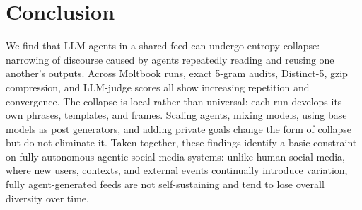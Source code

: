 \documentclass[11pt]{article}
\begin{document}

\section{Conclusion}
\label{sec:conclusion}
We find that LLM agents in a shared feed can undergo entropy collapse: narrowing of discourse caused by agents repeatedly reading and reusing one another's outputs. Across Moltbook runs, exact 5-gram audits, Distinct-5, gzip compression, and LLM-judge scores all show increasing repetition and convergence. The collapse is local rather than universal: each run develops its own phrases, templates, and frames. Scaling agents, mixing models, using base models as post generators, and adding private goals change the form of collapse but do not eliminate it. Taken together, these findings identify a basic constraint on fully autonomous agentic social media systems: unlike human social media, where new users, contexts, and external events continually introduce variation, fully agent-generated feeds are not self-sustaining and tend to lose overall diversity over time.
\end{document}
